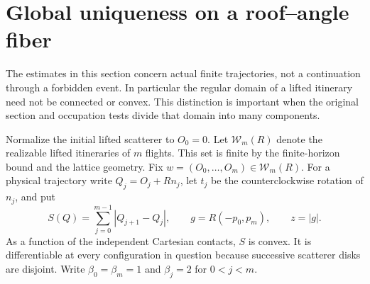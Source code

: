 \section{Global uniqueness on a roof--angle fiber}
\label{sec:v111-global}
The estimates in this section concern actual finite trajectories,
not a continuation through a forbidden event. In particular the
regular domain of a lifted itinerary need not be connected or convex.
This distinction is important when the original section and occupation
tests divide that domain into many components.

Normalize the initial lifted scatterer to $O_0=0$. Let
$\mathcal W_m(R)$ denote the realizable lifted itineraries of $m$
flights. This set is finite by the finite-horizon bound and the lattice
geometry. Fix $w=(O_0,\ldots,O_m)\in\mathcal W_m(R)$. For a physical trajectory
write $Q_j=O_j+Rn_j$, let $t_j$ be the counterclockwise rotation of
$n_j$, and put
\[
 S(Q)=\sum_{j=0}^{m-1}|Q_{j+1}-Q_j|,\qquad
 g=R(-p_0,p_m),\qquad z=|g|.
\]
As a function of the independent Cartesian contacts, $S$ is convex.
It is differentiable at every configuration in question because
successive scatterer disks are disjoint. Write $\beta_0=\beta_m=1$
and $\beta_j=2$ for $0<j<m$.

